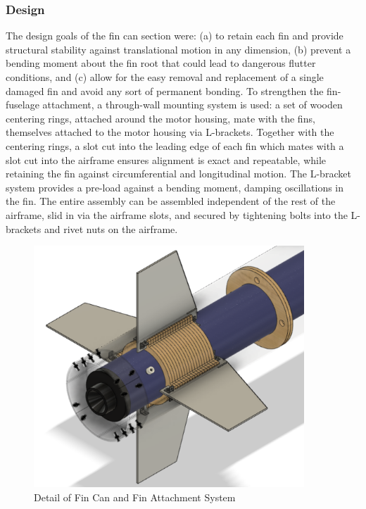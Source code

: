 \subsubsection*{Design}
The design goals of the fin can section were: (a) to retain each fin and provide structural stability against translational motion in any dimension, (b) prevent a bending moment about the fin root that could lead to dangerous flutter conditions, and (c) allow for the easy removal and replacement of a single damaged fin and avoid any sort of permanent bonding. To strengthen the fin-fuselage attachment, a through-wall mounting system is used: a set of wooden centering rings, attached around the motor housing, mate with the fins, themselves attached to the motor housing via L-brackets. Together with the centering rings, a slot cut into the leading edge of each fin which mates with a slot cut into the airframe ensures alignment is exact and repeatable, while retaining the fin against circumferential and longitudinal motion. The L-bracket system provides a pre-load against a bending moment, damping oscillations in the fin. The entire assembly can be assembled independent of the rest of the airframe, slid in via the airframe slots, and secured by tightening bolts into the L-brackets and rivet nuts on the airframe.
\begin{figure}[H]
	\centering
	\includegraphics[width=4in]{imgs/finattachmentdetail.png}
	\caption{Detail of Fin Can and Fin Attachment System}
	\label{fig:fincan}
\end{figure}
